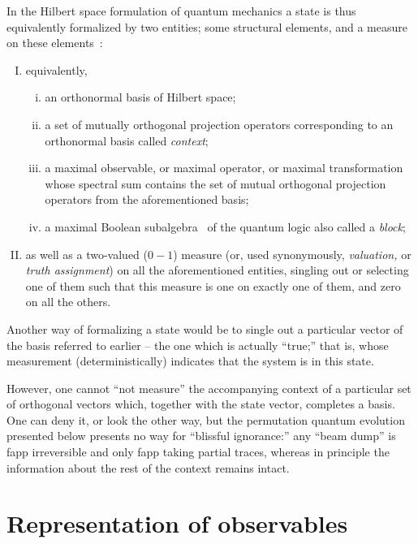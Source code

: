 In the Hilbert space formulation of quantum mechanics a state is thus equivalently
formalized by two entities; some structural elements, and a measure on these elements~\cite{svozil-2013-omelette}:
\begin{enumerate}[(I)]
\item  equivalently,
\begin{enumerate}[(i)]
\item
an orthonormal basis of Hilbert space;
\item
a set of mutually orthogonal projection operators corresponding to an orthonormal basis called
{\em context};
\item
a maximal observable, or maximal operator, or maximal transformation
whose spectral sum contains the set of mutual orthogonal projection operators from the aforementioned basis;
\item
a maximal Boolean subalgebra~\cite{greechie:71,kalmbach-83,nav:91,pulmannova-91} of the quantum logic also called  a
{\em block};
\end{enumerate}
\item     as well as
a two-valued ($0-1$) measure
(or, used synonymously, {\em valuation,} or {\em truth assignment})
on all the aforementioned entities,
singling out or selecting one of them
such that this measure is one on exactly one of them, and zero on all the others.
\end{enumerate}

Another way of formalizing a state would be to single out a particular vector of
the basis referred to earlier
--
the one which is actually ``true;''
that is, whose measurement (deterministically)
indicates that the system is in this state.

However, one cannot ``not measure'' the accompanying context of a particular set of orthogonal vectors which,
together with the state vector, completes a basis.
One can deny it, or look the other way, but the permutation quantum evolution presented below presents
no way for ``blissful ignorance:'' any ``beam dump'' is fapp irreversible and
only fapp taking partial traces, whereas in principle the information about the rest of the context remains intact.


\section{Representation of observables}

